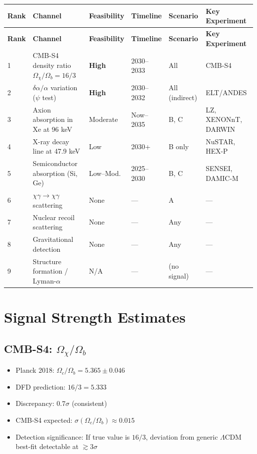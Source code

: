 \documentclass[12pt,a4paper]{article}
\begin{document}
\begin{longtable}{@{}p{0.6cm}p{3.8cm}p{1.5cm}p{1.8cm}p{2.0cm}p{3.2cm}@{}}
\toprule
\textbf{Rank} & \textbf{Channel} & \textbf{Feasibility} & \textbf{Timeline}
& \textbf{Scenario} & \textbf{Key Experiment} \\
\midrule
\endfirsthead
\toprule
\textbf{Rank} & \textbf{Channel} & \textbf{Feasibility} & \textbf{Timeline}
& \textbf{Scenario} & \textbf{Key Experiment} \\
\midrule
\endhead
1 & CMB-S4 density ratio $\Omega_\chi/\Omega_b = 16/3$
& \textbf{High} & 2030--2033 & All & CMB-S4 \\
\midrule
2 & $\delta\alpha/\alpha$ variation ($\psi$ test)
& \textbf{High} & 2030--2032 & All (indirect) & ELT/ANDES \\
\midrule
3 & Axion absorption in Xe at 96 keV
& Moderate & Now--2035 & B, C & LZ, XENONnT, DARWIN \\
\midrule
4 & X-ray decay line at 47.9 keV
& Low & 2030+ & B only & NuSTAR, HEX-P \\
\midrule
5 & Semiconductor absorption (Si, Ge)
& Low--Mod. & 2025--2030 & B, C & SENSEI, DAMIC-M \\
\midrule
6 & $\chi\gamma \to \chi\gamma$ scattering
& None & --- & A & --- \\
\midrule
7 & Nuclear recoil scattering
& None & --- & Any & --- \\
\midrule
8 & Gravitational detection
& None & --- & Any & --- \\
\midrule
9 & Structure formation / Lyman-$\alpha$
& N/A & --- & (no signal) & --- \\
\bottomrule
\end{longtable}

\section{Signal Strength Estimates}

\subsection{CMB-S4: $\Omega_\chi/\Omega_b$}

\begin{itemize}
\item Planck 2018: $\Omega_c/\Omega_b = 5.365 \pm 0.046$
\item DFD prediction: $16/3 = 5.333$
\item Discrepancy: $0.7\sigma$ (consistent)
\item CMB-S4 expected: $\sigma(\Omega_c/\Omega_b) \approx 0.015$
\item Detection significance: If true value is $16/3$, deviation from
generic $\Lambda$CDM best-fit detectable at $\gtrsim 3\sigma$
\end{itemize}
\end{document}
